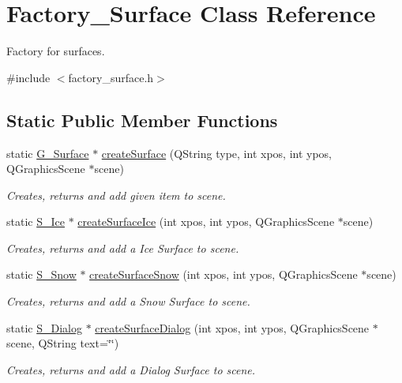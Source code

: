 \hypertarget{class_factory___surface}{}\section{Factory\+\_\+\+Surface Class Reference}
\label{class_factory___surface}


Factory for surfaces.  




{\ttfamily \#include $<$factory\+\_\+surface.\+h$>$}

\subsection*{Static Public Member Functions}
\begin{DoxyCompactItemize}
\item 
static \hyperlink{class_g___surface}{G\+\_\+\+Surface} $\ast$ \hyperlink{class_factory___surface_a4ff5816e81f603caf58d47d695a505d3}{create\+Surface} (Q\+String type, int xpos, int ypos, Q\+Graphics\+Scene $\ast$scene)
\begin{DoxyCompactList}\small\item\em Creates, returns and add given item to scene. \end{DoxyCompactList}\item 
static \hyperlink{class_s___ice}{S\+\_\+\+Ice} $\ast$ \hyperlink{class_factory___surface_ab17210244006ed087a5d19da4d5fd4bd}{create\+Surface\+Ice} (int xpos, int ypos, Q\+Graphics\+Scene $\ast$scene)
\begin{DoxyCompactList}\small\item\em Creates, returns and add a Ice Surface to scene. \end{DoxyCompactList}\item 
static \hyperlink{class_s___snow}{S\+\_\+\+Snow} $\ast$ \hyperlink{class_factory___surface_af8c720aacff1638f3be98c43790f1623}{create\+Surface\+Snow} (int xpos, int ypos, Q\+Graphics\+Scene $\ast$scene)
\begin{DoxyCompactList}\small\item\em Creates, returns and add a Snow Surface to scene. \end{DoxyCompactList}\item 
static \hyperlink{class_s___dialog}{S\+\_\+\+Dialog} $\ast$ \hyperlink{class_factory___surface_a00b899991e67f8b3ded65c759640d29d}{create\+Surface\+Dialog} (int xpos, int ypos, Q\+Graphics\+Scene $\ast$scene, Q\+String text=\char`\"{}\char`\"{})
\begin{DoxyCompactList}\small\item\em Creates, returns and add a Dialog Surface to scene. \end{DoxyCompactList}\item 

\end{DoxyCompactItemize}
